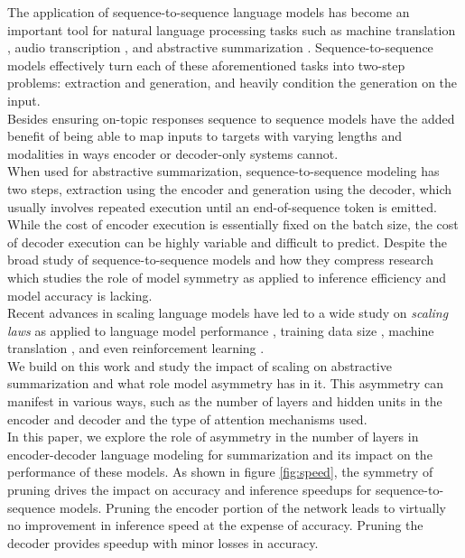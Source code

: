 The application of sequence-to-sequence language models has become an important tool for natural language processing tasks such as machine translation \cite{Sutskever2014SequenceTS}, audio transcription \cite{Radford2022RobustSR}, and abstractive summarization \cite{Raffel2020ExploringTL}. Sequence-to-sequence models effectively turn each of these aforementioned tasks into two-step problems: extraction and generation, and heavily condition the generation on the input. \\
Besides ensuring on-topic responses sequence to sequence models have the added benefit of being able to map inputs to targets with varying lengths and modalities in ways encoder or decoder-only systems cannot. \\
When used for abstractive summarization, sequence-to-sequence modeling has two steps, extraction using the encoder and generation using the decoder, which usually involves repeated execution until an end-of-sequence token is emitted. While the cost of encoder execution is essentially fixed on the batch size, the cost of decoder execution can be highly variable and difficult to predict. Despite the broad study of sequence-to-sequence models and how they compress research which studies the role of model symmetry as applied to inference efficiency and model accuracy is lacking. \\
Recent advances in scaling language models have led to a wide study on \textit{scaling laws} as applied to language model performance \cite{Kaplan2020ScalingLF}, training data size \cite{Hoffmann2022TrainingCL}, machine translation \cite{Henighan2020ScalingLF}, and even reinforcement learning \cite{Neumann2022ScalingLF}. \\
We build on this work and study the impact of scaling on abstractive summarization and what role model asymmetry has in it.
This asymmetry can manifest in various ways, such as the number of layers and hidden units in the encoder and decoder and the type of attention mechanisms used. \\
In this paper, we explore the role of asymmetry in the number of layers in encoder-decoder language modeling for summarization and its impact on the performance of these models. As shown in figure \ref{fig:speed}, the symmetry of pruning drives the impact on accuracy and inference speedups for sequence-to-sequence models. Pruning the encoder portion of the network leads to virtually no improvement in inference speed at the expense of accuracy. Pruning the decoder provides speedup with minor losses in accuracy. 

